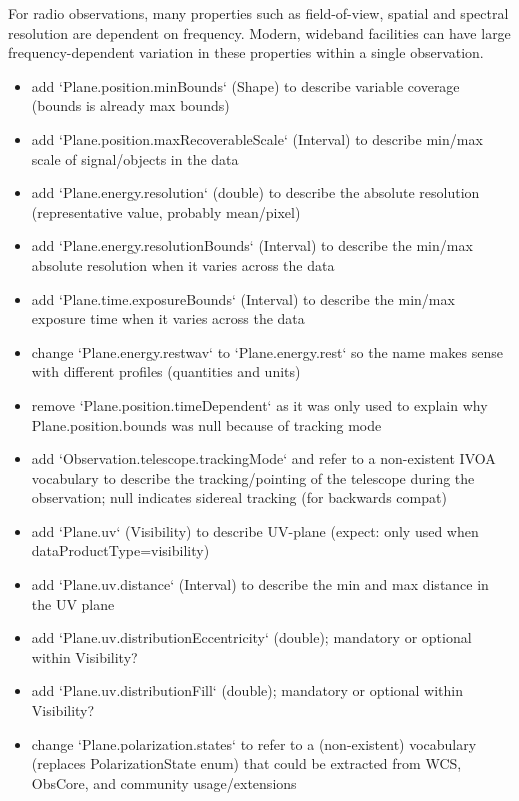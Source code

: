 \documentclass[11pt,a4paper]{ivoa}
\begin{document}
For radio observations, many properties such as field-of-view, spatial and spectral resolution are dependent on frequency. Modern, wideband facilities can have large frequency-dependent variation in these properties within a single observation.
\begin{itemize}
\item add `Plane.position.minBounds` (Shape) to describe variable coverage (bounds is already max bounds)

\item add `Plane.position.maxRecoverableScale` (Interval) to describe min/max scale of signal/objects in the data

\item add `Plane.energy.resolution` (double) to describe the absolute resolution (representative value, probably mean/pixel)

\item add `Plane.energy.resolutionBounds` (Interval) to describe the min/max absolute resolution when it varies across the data

\item add `Plane.time.exposureBounds` (Interval) to describe the min/max exposure time when it varies across the data

\item change `Plane.energy.restwav` to `Plane.energy.rest` so the name makes sense with different profiles (quantities and units)

\item remove `Plane.position.timeDependent` as it was only used to explain why Plane.position.bounds was null because of tracking mode

\item add `Observation.telescope.trackingMode` and refer to a non-existent IVOA vocabulary to describe the 
  tracking/pointing of the telescope during the observation; null indicates sidereal tracking (for backwards compat)

\item add `Plane.uv` (Visibility) to describe UV-plane (expect: only used when dataProductType=visibility)

\item add `Plane.uv.distance` (Interval) to describe the min and max distance in the UV plane

\item add `Plane.uv.distributionEccentricity` (double); mandatory or optional within Visibility?

\item add `Plane.uv.distributionFill` (double); mandatory or optional within Visibility?

\item change `Plane.polarization.states` to refer to a (non-existent) vocabulary (replaces PolarizationState enum) that could be extracted from WCS, ObsCore, and community usage/extensions
\end{itemize}
\end{document}
